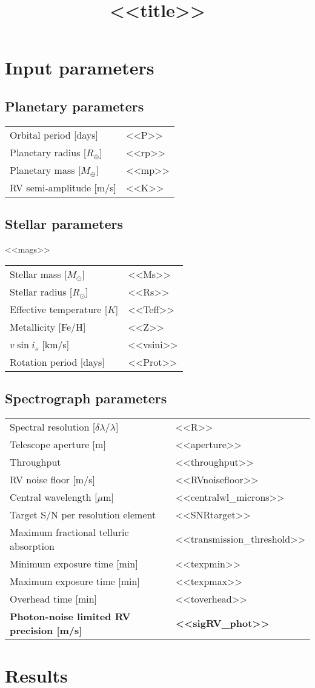 \documentclass[a4paper]{article}
\title{\textbf{<<title>>}}
\begin{document}
\maketitle

\section{Input parameters}
\subsection{Planetary parameters}
\begin{tabular}{ll}
  Orbital period [days] & <<P>> \\
  Planetary radius [$R_{\oplus}$] & <<rp>> \\
  Planetary mass [$M_{\oplus}$] & <<mp>> \\
  RV semi-amplitude [m/s] & <<K>>
\end{tabular}

\subsection{Stellar parameters}
<<mags>> \\

\noindent
\begin{tabular}{ll}
  Stellar mass [$M_{\odot}$] & <<Ms>> \\  
  Stellar radius [$R_{\odot}$] & <<Rs>> \\
  Effective temperature [$K$] & <<Teff>> \\
  Metallicity [Fe/H] & <<Z>> \\
  $v\sin{i_s}$ [km/s] & <<vsini>> \\
  Rotation period [days] & <<Prot>>
\end{tabular}

\subsection{Spectrograph parameters}
\begin{tabular}{ll}
  Spectral resolution [$\delta \lambda / \lambda$] & <<R>> \\
  Telescope aperture [m] & <<aperture>> \\
  Throughput & <<throughput>> \\
  RV noise floor [m/s] & <<RVnoisefloor>> \\
  Central wavelength [$\mu$m] & <<centralwl_microns>> \\ 
  Target S/N per resolution element & <<SNRtarget>> \\
  Maximum fractional telluric absorption & <<transmission_threshold>> \\
  Minimum exposure time [min] & <<texpmin>> \\
  Maximum exposure time [min] & <<texpmax>> \\
  Overhead time [min] & <<toverhead>> \\
  \textbf{Photon-noise limited RV precision [m/s]} & \textbf{<<sigRV_phot>>}
\end{tabular}

\pagebreak

\section{Results}
\end{document}
